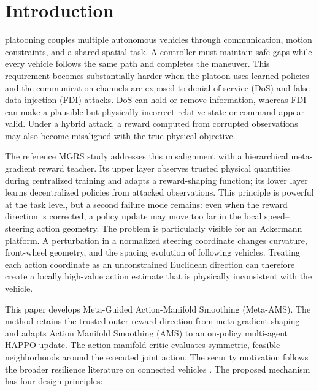 \documentclass[lettersize,journal]{IEEEtran}
\begin{document}
\section{Introduction}
 platooning couples multiple autonomous vehicles through communication, motion constraints, and a shared spatial task. A controller must maintain safe gaps while every vehicle follows the same path and completes the maneuver. This requirement becomes substantially harder when the platoon uses learned policies and the communication channels are exposed to denial-of-service (DoS) and false-data-injection (FDI) attacks. DoS can hold or remove information, whereas FDI can make a plausible but physically incorrect relative state or command appear valid. Under a hybrid attack, a reward computed from corrupted observations may also become misaligned with the true physical objective.

The reference MGRS study \cite{xia2026security} addresses this misalignment with a hierarchical meta-gradient reward teacher. Its upper layer observes trusted physical quantities during centralized training and adapts a reward-shaping function; its lower layer learns decentralized policies from attacked observations. This principle is powerful at the task level, but a second failure mode remains: even when the reward direction is corrected, a policy update may move too far in the local speed--steering action geometry. The problem is particularly visible for an Ackermann platform. A perturbation in a normalized steering coordinate changes curvature, front-wheel geometry, and the spacing evolution of following vehicles. Treating each action coordinate as an unconstrained Euclidean direction can therefore create a locally high-value action estimate that is physically inconsistent with the vehicle.

This paper develops Meta-Guided Action-Manifold Smoothing (Meta-AMS). The method retains the trusted outer reward direction from meta-gradient shaping and adapts Action Manifold Smoothing (AMS) \cite{lin2026actionmanifold} to an on-policy multi-agent HAPPO update. The action-manifold critic evaluates symmetric, feasible neighborhoods around the executed joint action. The security motivation follows the broader resilience literature on connected vehicles \cite{ju2022survey,zhao2024safeguard}. The proposed mechanism has four design principles:
\end{document}
